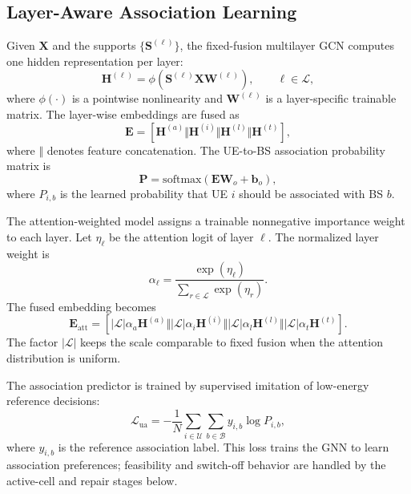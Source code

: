 \documentclass[journal]{IEEEtran}
\begin{document}
\subsection{Layer-Aware Association Learning}
Given $\mathbf{X}$ and the supports $\{\mathbf{S}^{(\ell)}\}$, the fixed-fusion
multilayer GCN computes one hidden representation per layer:
\begin{equation}
    \mathbf{H}^{(\ell)}
    =\phi\left(\mathbf{S}^{(\ell)}\mathbf{X}\mathbf{W}^{(\ell)}\right),
    \qquad \ell\in\mathcal{L},
    \label{eq:layer_gcn}
\end{equation}
where $\phi(\cdot)$ is a pointwise nonlinearity and
$\mathbf{W}^{(\ell)}$ is a layer-specific trainable matrix. The layer-wise
embeddings are fused as
\begin{equation}
    \mathbf{E} =
    \left[\mathbf{H}^{(a)}\Vert\mathbf{H}^{(i)}
    \Vert\mathbf{H}^{(l)}\Vert\mathbf{H}^{(t)}\right],
    \label{eq:fixed_fusion}
\end{equation}
where $\Vert$ denotes feature concatenation. The UE-to-BS association
probability matrix is
\begin{equation}
    \mathbf{P} =
    \mathrm{softmax}\left(\mathbf{E}\mathbf{W}_o+\mathbf{b}_o\right),
    \label{eq:association_prob}
\end{equation}
where $P_{i,b}$ is the learned probability that UE $i$ should be associated
with BS $b$.

The attention-weighted model assigns a trainable nonnegative importance weight
to each layer. Let $\eta_{\ell}$ be the attention logit of layer $\ell$. The
normalized layer weight is
\begin{equation}
    \alpha_{\ell} =
    \frac{\exp(\eta_{\ell})}
    {\sum_{r\in\mathcal{L}}\exp(\eta_r)}.
    \label{eq:attention_weight}
\end{equation}
The fused embedding becomes
\begin{equation}
    \mathbf{E}_{\mathrm{att}} =
    \left[|\mathcal{L}|\alpha_a\mathbf{H}^{(a)}
    \Vert |\mathcal{L}|\alpha_i\mathbf{H}^{(i)}
    \Vert |\mathcal{L}|\alpha_l\mathbf{H}^{(l)}
    \Vert |\mathcal{L}|\alpha_t\mathbf{H}^{(t)}\right].
    \label{eq:att_fusion}
\end{equation}
The factor $|\mathcal{L}|$ keeps the scale comparable to fixed fusion when the
attention distribution is uniform.

The association predictor is trained by supervised imitation of low-energy
reference decisions:
\begin{equation}
    \mathcal{L}_{\mathrm{ua}} =
    -\frac{1}{N}\sum_{i\in\mathcal{U}}
    \sum_{b\in\mathcal{B}} y_{i,b}\log P_{i,b},
    \label{eq:ua_loss}
\end{equation}
where $y_{i,b}$ is the reference association label. This loss trains the GNN to
learn association preferences; feasibility and switch-off behavior are handled
by the active-cell and repair stages below.
\end{document}

